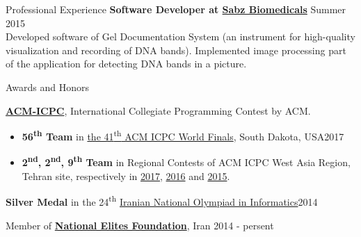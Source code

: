 \documentclass{resume} %
\begin{document}
\begin{rSection}{Professional Experience}
	{\bf Software Developer at \href{http://www.sabzgroup.com/}{Sabz Biomedicals}} \hfill Summer 2015
	\\Developed software of Gel Documentation System (an instrument for high-quality visualization and recording of DNA bands). Implemented image processing part of the application for detecting DNA bands in a picture.
\end{rSection}


\begin{rSection}{Awards and Honors}

	{\bf \href{http://icpc.baylor.edu/}{ACM-ICPC}}, International Collegiate Programming Contest by ACM.
	\begin{itemize}
		\item {\bf 56\textsuperscript{th} Team} in
		\href{https://icpc.baylor.edu/community/results-2017}{the 41\textsuperscript{th} ACM ICPC World Finals},
		South Dakota, USA\hfill 2017

		\item {\bf 2\textsuperscript{nd}, 2\textsuperscript{nd}, 9\textsuperscript{th} Team} in Regional Contests of ACM ICPC West Asia Region,
		Tehran site, respectively in
		\href{http://icpc.sharif.edu/acmicpc17/scoreboard/}{2017},
		\href{http://icpc.sharif.edu/acmicpc16/scoreboard/}{2016} and
		\href{http://icpc.sharif.edu/acmicpc15/scoreboard/}{2015}.
	\end{itemize}

	{\bf Silver Medal} in the 24\textsuperscript{th} \href{http://inoi.ir/}{Iranian National Olympiad in Informatics}\hfill 2014

	Member of \href{https://www.bmn.ir/}{{\bf National Elites Foundation}}, Iran \hfill 2014 - persent
	
\end{rSection}

\end{document}
